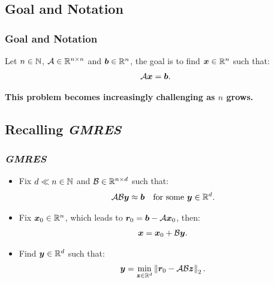 \subsection{Goal and Notation}

\begin{frame}
    \frametitle{Goal and Notation}

    Let $n \in \mathbb{N}$,  $\mathcal{A} \in \mathbb{R}^{n \times n}$ and $\bm{b} \in \mathbb{R}^{n}$, the goal is to find $\bm{x} \in \mathbb{R}^{n}$ such that:
    \begin{align}
        \mathcal{A} \bm{x} = \bm{b}. \label{eq:system}
    \end{align}

    \textbf{This problem becomes increasingly challenging as $n$ grows.}

\end{frame}

\subsection{Recalling \textit{GMRES}}

\begin{frame}
    \frametitle{\textit{GMRES}}

    \begin{itemize}
        \item Fix $d \ll n \in \mathbb{N}$ and $\mathcal{B} \in \mathbb{R}^{n \times d}$ such that:
        \begin{align}
            \mathcal{A} \mathcal{B} \bm{y} &\approx \bm{b} &\text{for some } \bm{y} \in \mathbb{R}^{d}.
        \end{align}

        \item Fix $\bm{x}_0 \in \mathbb{R}^{n}$, which leads to $\bm{r}_0 = \bm{b} - \mathcal{A} \bm{x}_0$, then:
        \begin{align}
            \bm{x} = \bm{x}_0 + \mathcal{B} \bm{y}.
        \end{align}

        \item Find $\bm{y} \in \mathbb{R}^{d}$ such that:
        \begin{align}
            \bm{y} = \min_{\bm{z} \in \mathbb{R}^{d}} \left\lVert \bm{r}_0 - \mathcal{A} \mathcal{B} \bm{z} \right\rVert_2. \label{eq:min_problem}
        \end{align}
    \end{itemize}

\end{frame}

